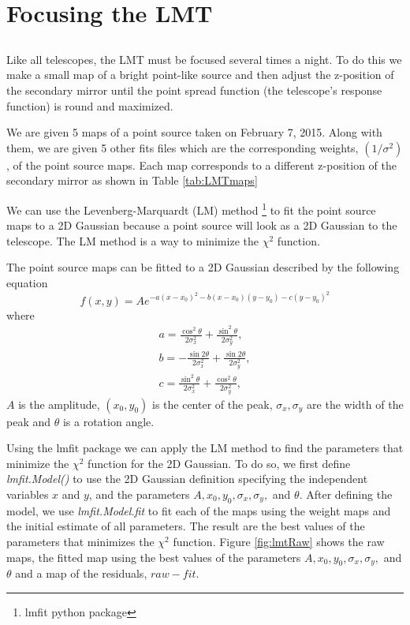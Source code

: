 \section{Focusing the LMT}

\subsection{}
Like all telescopes, the LMT must be focused several times a night.
To do this we make a small map of a bright point-like source and then adjust the z-position of the secondary mirror until the point spread function (the telescope’s response function) is round and maximized. 

We are given 5 maps of a point source taken on February 7, 2015. Along with them, we are given 5 other fits files which are the corresponding weights, $(1/\sigma^2)$, of the point source maps. Each map corresponds to a different z-position of the secondary mirror as shown in Table \ref{tab:LMTmaps}

We can use the Levenberg-Marquardt (LM) method \footnote{lmfit python package} to fit the point source maps to a 2D Gaussian because a point source will look as a 2D Gaussian to the telescope. The LM method is a way to minimize the $\chi^2$ function.

The point source maps can be fitted to a 2D Gaussian described by the following equation
\begin{equation}
    f(x,y)=Ae^{-a(x-x_0)^2-b(x-x_0)(y-y_0)-c(y-y_0)^2}
\end{equation}
where 
\begin{align}
    a=\frac{\cos^2\theta}{2\sigma_x^2}+\frac{\sin^2\theta}{2\sigma_y^2},\\
    b=-\frac{\sin 2\theta}{2\sigma_x^2}+\frac{\sin 2\theta}{2\sigma_y^2},\\
    c=\frac{\sin^2\theta}{2\sigma_x^2}+\frac{\cos^2\theta}{2\sigma_y^2},
\end{align}
$A$ is the amplitude, $(x_0,y_0)$ is the center of the peak, $\sigma_x,\sigma_y$ are the width of the peak and $\theta$ is a rotation angle.

Using the lmfit package we can apply the LM method to find the parameters that minimize the $\chi^2$ function for the 2D Gaussian. To do so, we first define \emph{lmfit.Model()} to use the 2D Gaussian definition specifying the independent variables $x$ and $y$, and the parameters $A,x_0,y_0,\sigma_x,\sigma_y,$ and $\theta$. After defining the model, we use \emph{lmfit.Model.fit} to fit each of the maps using the weight maps and the initial estimate of all parameters. The result are the best values of the parameters that minimizes the $\chi^2$ function. 
Figure \ref{fig:lmtRaw} shows the raw maps, the fitted map using the best values of the parameters $A,x_0,y_0,\sigma_x,\sigma_y,$ and $\theta$ and a map of the residuals, $raw-fit$. 

